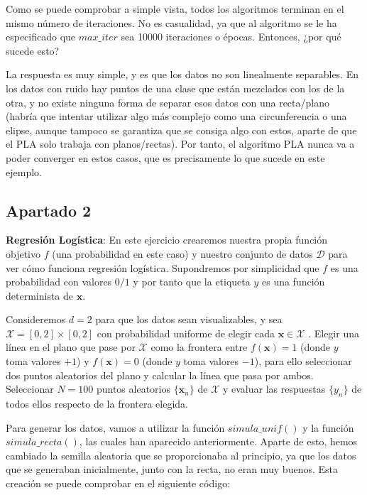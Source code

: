 \documentclass[11pt,a4paper]{article}
\begin{document}
Como se puede comprobar a simple vista, todos los algoritmos terminan en el mismo número de
iteraciones. No es casualidad, ya que al algoritmo se le ha especificado que $max\_iter$ sea
10000 iteraciones o épocas. Entonces, ¿por qué sucede esto?

La respuesta es muy simple, y es que los datos no son linealmente separables. En los datos con ruido
hay puntos de una clase que están mezclados con los de la otra, y no existe ninguna forma de
separar esos datos con una recta/plano (habría que intentar utilizar algo más complejo como una
circunferencia o una elipse, aunque tampoco se garantiza que se consiga algo con estos, aparte de
que el PLA solo trabaja con planos/rectas). Por tanto, el algoritmo PLA nunca va a poder converger en
estos casos, que es precisamente lo que sucede en este ejemplo.

\subsection*{Apartado 2}

\noindent \textbf{Regresión Logística}: En este ejercicio crearemos nuestra propia función
objetivo $f$ (una probabilidad en este caso) y nuestro conjunto de datos $\mathcal{D}$ para ver cómo
funciona regresión logística. Supondremos por simplicidad que $f$ es una probabilidad con
valores $0/1$ y por tanto que la etiqueta $y$ es una función determinista de $\mathbf{x}$.

\noindent Consideremos $d = 2$ para que los datos sean visualizables, y sea
$\mathcal{X} = [0, 2] \times [0, 2]$ con probabilidad uniforme de elegir cada
$\mathbf{x} \in \mathcal{X}$ . Elegir una línea en el plano que pase por $\mathcal{X}$
como la frontera entre $f(\mathbf{x}) = 1$ (donde $y$ toma valores $+1$) y $f(\mathbf{x}) = 0$
(donde $y$ toma valores $-1$), para ello seleccionar dos puntos aleatorios del plano y calcular la
línea que pasa por ambos. Seleccionar $N = 100$ puntos aleatorios $\lbrace \mathbf{x}_n \rbrace$
de $\mathcal{X}$ y evaluar las respuestas $\lbrace y_n \rbrace$ de todos ellos respecto de la frontera
elegida.

Para generar los datos, vamos a utilizar la función $simula\_unif()$ y la función $simula\_recta()$,
las cuales han aparecido anteriormente. Aparte de esto, hemos cambiado la semilla aleatoria que se
proporcionaba al principio, ya que los datos que se generaban inicialmente, junto con la recta, no
eran muy buenos. Esta creación se puede comprobar en el siguiente código:
\end{document}
